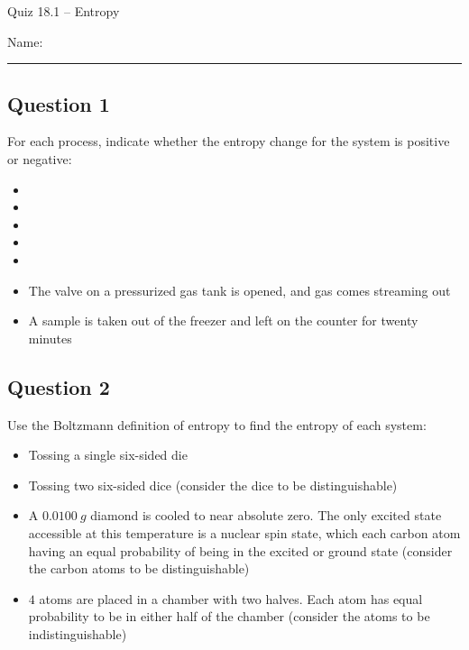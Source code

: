 \documentclass[11pt, letterpaper]{memoir}
\begin{document}
	\begin{center}
		{\large	Quiz 18.1 -- Entropy}
	\end{center}
	{\large Name: \rule[-1mm]{4in}{.1pt} 

\subsection*{Question 1}
For each process, indicate whether the entropy change for the system is positive or negative:
\begin{itemize}
	\item {}
	\item {}
	\item {}
	\item {}
	\item {}
	\item The valve on a pressurized gas tank is opened, and gas comes streaming out
	\item A sample is taken out of the freezer and left on the counter for twenty minutes
\end{itemize}

\subsection*{Question 2}
Use the Boltzmann definition of entropy to find the entropy of each system:
\begin{itemize}
	\item Tossing a single six-sided die
	
	\vspace{3em}
	\item Tossing two six-sided dice (consider the dice to be distinguishable)
	
	\vspace{3em}
	\item A $0.0100~g$ diamond is cooled to near absolute zero. The only excited state accessible at this temperature is a nuclear spin state, which each carbon atom having an equal probability of being in the excited or ground state (consider the carbon atoms to be distinguishable)
	
	\vspace{3em}
	\item $4$  atoms are placed in a chamber with two halves. Each atom has equal probability to be in either half of the chamber (consider the  atoms to be indistinguishable)
	

\end{itemize}}
\end{document}
